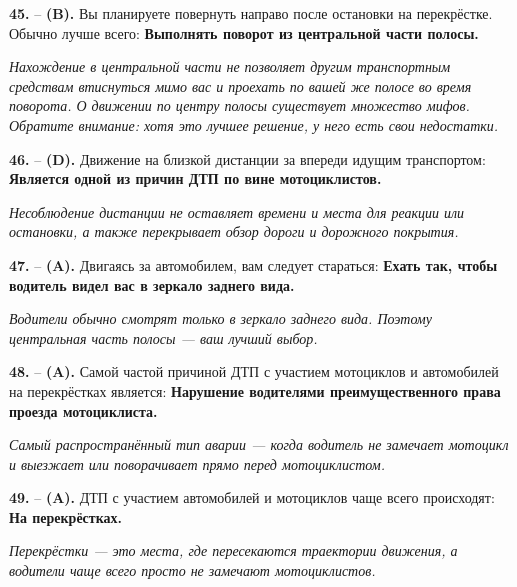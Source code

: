 \begin{minipage}{\linewidth}
\noindent\textbf{45.}  -- \textbf {(B).} Вы планируете повернуть направо после остановки на перекрёстке. Обычно лучше всего:  \textbf {Выполнять поворот из центральной части полосы.} \par \textit {Нахождение в центральной части не позволяет другим транспортным средствам втиснуться мимо вас и проехать по вашей же полосе во время поворота. О движении по центру полосы существует множество мифов. Обратите внимание: хотя это лучшее решение, у него есть свои недостатки.} \\
\end{minipage}

\begin{minipage}{\linewidth}
\noindent\textbf{46.}  -- \textbf {(D).} Движение на близкой дистанции за впереди идущим транспортом:  \textbf {Является одной из причин ДТП по вине мотоциклистов.} \par \textit {Несоблюдение дистанции не оставляет времени и места для реакции или остановки, а также перекрывает обзор дороги и дорожного покрытия.} \\
\end{minipage}

\begin{minipage}{\linewidth}
\noindent\textbf{47.}  -- \textbf {(A).} Двигаясь за автомобилем, вам следует стараться:  \textbf {Ехать так, чтобы водитель видел вас в зеркало заднего вида.} \par \textit {Водители обычно смотрят только в зеркало заднего вида. Поэтому центральная часть полосы — ваш лучший выбор.} \\
\end{minipage}

\begin{minipage}{\linewidth}
\noindent\textbf{48.}  -- \textbf {(A).} Самой частой причиной ДТП с участием мотоциклов и автомобилей на перекрёстках является:  \textbf {Нарушение водителями преимущественного права проезда мотоциклиста.} \par \textit {Самый распространённый тип аварии — когда водитель не замечает мотоцикл и выезжает или поворачивает прямо перед мотоциклистом.} \\
\end{minipage}

\begin{minipage}{\linewidth}
\noindent\textbf{49.}  -- \textbf {(A).} ДТП с участием автомобилей и мотоциклов чаще всего происходят:  \textbf {На перекрёстках.} \par \textit {Перекрёстки — это места, где пересекаются траектории движения, а водители чаще всего просто не замечают мотоциклистов.} \\
\end{minipage}


